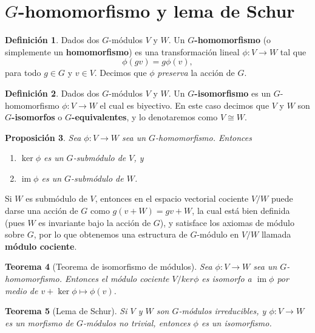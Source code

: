 \documentclass[12pt]{book}
\newtheorem{theorem}{Teorema}[section]
\newtheorem{proposition}[theorem]{Proposición}
\theoremstyle{definition}
\newtheorem{definition}[theorem]{Definición}
\DeclareMathOperator{\im}{im}
\newcounter{in}
\newcounter{ini}
\begin{document}
\section{$G$-homomorfismo y lema de Schur} 
\label{schur}

\begin{definition}
  Dados dos $G$-módulos $V$ y $W$. Un $G$\textbf{-homomorfismo} (o simplemente
  un \textbf{homomorfismo}) es una transformación lineal $\phi:V\rightarrow
  W$ tal que
  \begin{equation*}
    \phi(gv)=g\phi(v),
  \end{equation*}
para todo $g\in G$ y $v\in V$. Decimos que $\phi$ \emph{preserva} la acción
de $G$.
\end{definition}

\begin{definition}
  Dados dos $G$-módulos $V$ y $W$. Un $G$\textbf{-isomorfismo} es un
  $G$-homomorfismo $\phi:V\rightarrow W$ el cual es biyectivo. En
  este caso decimos que $V$ y $W$ son $G$\textbf{-isomorfos} o
  $G$\textbf{-equivalentes}, y lo denotaremos como $V\cong W$.
\end{definition}

\begin{proposition}
  Sea $\phi:V\rightarrow W$ sea un $G$-homomorfismo. Entonces
  \begin{enumerate}
  \item $\ker\phi$ es un $G$-submódulo de $V$, y
  \item $\im\phi$ es un $G$-submódulo de $W$.
  \end{enumerate}
\end{proposition}

Si $W$ es submódulo de $V$, entonces en el espacio vectorial cociente
$V/W$ puede darse una acción de $G$ como $g(v+W)=gv+W$, la cual está
bien definida (pues $W$ es invariante bajo la acción de $G$), y
satisface los axiomas de módulo sobre $G$, por lo que obtenemos una
estructura de $G$-módulo en $V/W$ llamada \textbf{módulo cociente}.

\begin{theorem}[Teorema de isomorfismo de módulos]
  \label{teorema-isomorfismo-mod}
  Sea $\phi:V\rightarrow W$ sea un $G$-homomorfismo. Entonces el
  módulo cociente $V/ker\phi$ es isomorfo a $\im\phi$ por medio de
  $v+\ker\phi\mapsto\phi(v)$.
\end{theorem}

\begin{theorem}[Lema de Schur]
  \label{lema-schur}
  Si $V$ y $W$ son $G$-módulos irreducibles, y $\phi:V\rightarrow W$
  es un morfismo de $G$-módulos no trivial, entonces $\phi$ es un isomorfismo.
\end{theorem}
\end{document}

